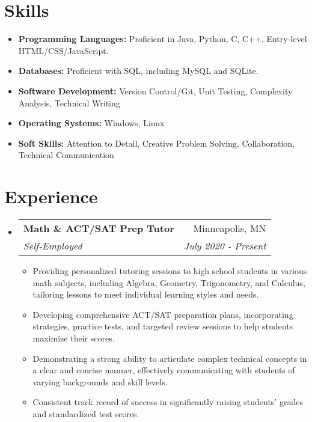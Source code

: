 \documentclass[letterpaper,11pt]{article}
\makeatletter
\newcommand{\resumeSubheading}[4]{
  \vspace{-1pt}\item
    \begin{tabular*}{0.97\textwidth}{l@{\extracolsep{\fill}}r}
      \textbf{#1} & #2 \vspace{-2pt}\\
      \textit{\small#3} & \textit{\small #4} \\
    \end{tabular*}\vspace{-8pt}
}
\newcommand{\projectItem}[1]{
  \item\small{
    {#1 \vspace{-4pt}}
  }
}
\newcommand{\resumeSubHeadingListStart}{\begin{itemize}[leftmargin=*]}
\newcommand{\resumeSubHeadingListEnd}{\end{itemize}}
\newcommand{\resumeItemListStart}{\begin{itemize}}
\newcommand{\resumeItemListEnd}{\end{itemize}\vspace{-8pt}}
\makeatother
\begin{document}
\section{Skills}
 \resumeSubHeadingListStart
   \item{
     \textbf{Programming Languages:} {Proficient in Java, Python, C, C++. Entry-level HTML/CSS/JavaScript.} \\ \vspace{-5pt}
   }
   \item{
     \textbf{Databases:}{ Proficient with SQL, including MySQL and SQLite.} \\ \vspace{-5pt}
   }
   \item{
     \textbf{Software Development:}{ Version Control/Git, Unit Testing, Complexity Analysis, Technical Writing} \\ \vspace{-5pt}
   }
    \item{
     \textbf{Operating Systems:}{ Windows, Linux} \\ \vspace{-5pt}
   }
   \item{
     \textbf{Soft Skills:}{ Attention to Detail, Creative Problem Solving, Collaboration, Technical Communication} \\ \vspace{-1pt}
   }
   
 \resumeSubHeadingListEnd

\section{Experience} 
  \resumeSubHeadingListStart
    \resumeSubheading
      {Math \& ACT/SAT Prep Tutor}{Minneapolis, MN}
      {Self-Employed}{July 2020 - Present}
      \resumeItemListStart
        \projectItem
          {Providing personalized tutoring sessions to high school students in various math subjects, including Algebra, Geometry, Trigonometry, and Calculus, tailoring lessons to meet individual learning styles and needs.}
        \projectItem
          {Developing comprehensive ACT/SAT preparation plans, incorporating strategies, practice tests, and targeted review sessions to help students maximize their scores.}
        \projectItem
          {Demonstrating a strong ability to articulate complex technical concepts in a clear and concise manner, effectively communicating with students of varying backgrounds and skill levels.}
        \projectItem
          {Consistent track record of success in significantly raising students' grades and standardized test scores.}
      \resumeItemListEnd 
  \resumeSubHeadingListEnd 
\end{document}
